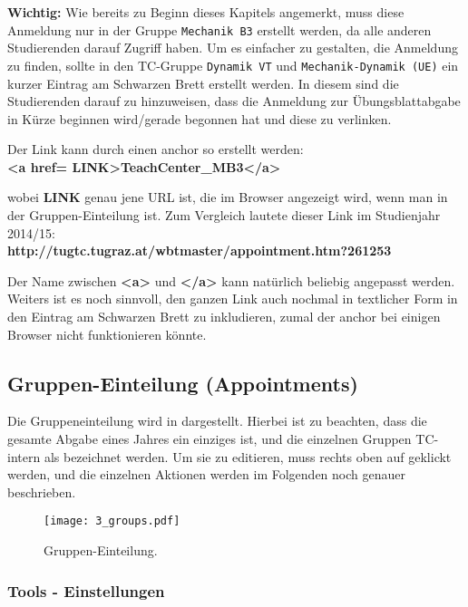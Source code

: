 {\bf Wichtig:}
Wie bereits zu Beginn dieses Kapitels angemerkt, muss diese Anmeldung nur in
der Gruppe {\tt Mechanik B3} erstellt werden, da alle anderen Studierenden
darauf Zugriff haben. Um es einfacher zu gestalten, die Anmeldung
zu finden, sollte in den TC-Gruppe {\tt Dynamik VT} und 
{\tt Mechanik-Dynamik (UE)} ein kurzer Eintrag am Schwarzen Brett erstellt 
werden. In diesem sind die Studierenden darauf zu hinzuweisen, dass die 
Anmeldung zur Übungsblattabgabe in Kürze beginnen wird/gerade begonnen hat und 
diese zu verlinken.

Der Link kann durch einen anchor so erstellt werden:\\
{\bf
<a href= \grqq{}LINK\grqq{}>TeachCenter\_MB3</a>
}

wobei \textbf{LINK} genau jene URL ist, die im Browser angezeigt wird, wenn
man in der Gruppen-Einteilung ist. Zum Vergleich lautete dieser Link
im Studienjahr 2014/15:\\
{\bf http://tugtc.tugraz.at/wbtmaster/appointment.htm?261253 }

Der Name zwischen {\bf <a>} und  {\bf </a>} kann natürlich beliebig
angepasst werden. Weiters ist es noch sinnvoll, den ganzen Link auch nochmal
in textlicher Form in den Eintrag am Schwarzen Brett zu inkludieren, zumal
der anchor bei einigen Browser nicht funktionieren könnte.


\subsection{Gruppen-Einteilung (Appointments)}

Die Gruppeneinteilung wird in  dargestellt. Hierbei ist zu
beachten, dass die gesamte Abgabe eines Jahres ein einziges 
ist, und die einzelnen Gruppen TC-intern als  bezeichnet werden.
Um sie zu editieren, muss rechts oben auf  geklickt werden, und
die einzelnen Aktionen werden im Folgenden noch genauer beschrieben.

\begin{figure}[htbp]
\begin{center}
  \texttt{[image: 3\_groups.pdf]}
  \caption{ Gruppen-Einteilung.}
  \label{fig:groups}
\end{center}
\end{figure}

\subsubsection{Tools - Einstellungen}


